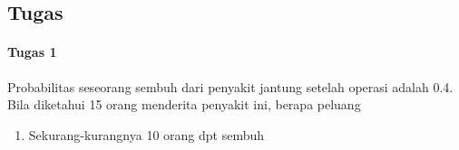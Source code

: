 \documentclass[a4paper,12pt]{article}
\begin{document}
\subsection{Tugas}
\paragraph{Tugas 1\\}
Probabilitas seseorang sembuh dari penyakit jantung setelah operasi adalah 0.4. Bila
diketahui 15 orang menderita penyakit ini, berapa peluang
\begin{enumerate}[label = \alph*.]
	\item Sekurang-kurangnya 10 orang dpt sembuh
\end{enumerate}
\end{document}
